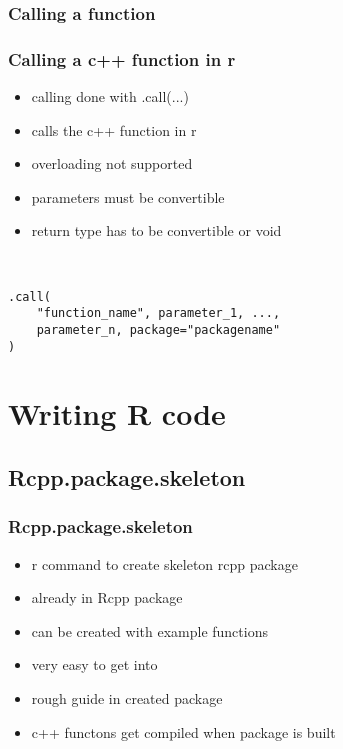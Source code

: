 \documentclass[hyperef={
    colorlinks=true,
    linkcolor=blue,
    filecolor=black,
urlcolor=blue}
]{beamer}
\begin{document}
\subsubsection{Calling a function}
\begin{frame}[fragile]
\frametitle{Calling a c++ function in r}
\begin{itemize}
    \item calling done with .call(...)
    \item calls the c++ function in r
    \item overloading not supported
    \item parameters must be convertible
    \item return type has to be convertible or void
\end{itemize}
\hspace{4 mm} \\
\begin{verbatim}
.call(
    "function_name", parameter_1, ...,
    parameter_n, package="packagename"
)
\end{verbatim}
\end{frame}

\section{Writing R code}
\subsection{Rcpp.package.skeleton}
\begin{frame}
    \frametitle{Rcpp.package.skeleton}
\begin{itemize}
    \item r command to create skeleton rcpp package
    \item already in Rcpp package
    \item can be created with example functions
    \item very easy to get into
    \item rough guide in created package
    \item c++ functons get compiled when package is built
\end{itemize}
\end{frame}
\end{document}
